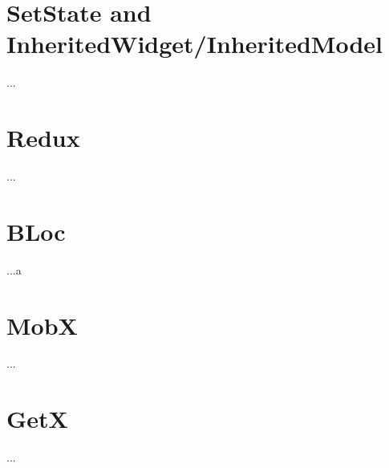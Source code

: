 
\section{SetState and InheritedWidget/InheritedModel}
\label{sec:setState}

...
\section{Redux}
\label{sec:Redux}

...
\section{BLoc}
\label{sec:BLoC}

...a
\section{MobX}
\label{sec:MobX}

...
\section{GetX}
\label{sec:GetX}

...